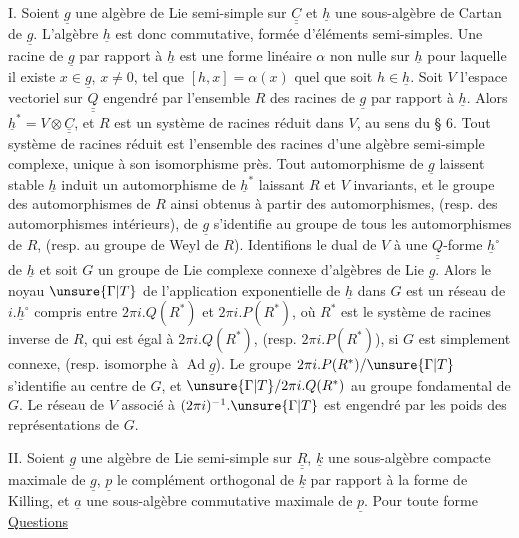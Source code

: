 I. Soient $\underline{g}$ une algèbre de Lie semi-simple sur $\underline{\underline{C}}$ et $\underline{h}$ une sous-algèbre de
Cartan de $\underline{g}$. L'algèbre $\underline{h}$ est donc commutative, formée d'éléments semi-simples.
Une racine de $\underline{g}$ par rapport à $\underline{h}$ est une forme linéaire $\alpha$ non nulle sur $\underline{h}$ pour
laquelle il existe $x\in\underline{g}$, $x\ne0$, tel que $[h,x]=\alpha(x)$ quel que soit $h\in\underline{h}$.
Soit $V$ l'espace vectoriel sur $\underline{\underline{Q}}$ engendré par l'ensemble $R$ des racines de $\underline{g}$ par
rapport à $\underline{h}$. Alors $\underline{h}^{*}=V\otimes\underline{\underline{C}}$, et $R$ est un système de racines réduit dans $V$,
au sens du § 6. Tout système de racines réduit est l'ensemble des racines d'une
algèbre semi-simple complexe, unique à son isomorphisme près. Tout automorphisme
de $\underline{g}$ laissent stable $\underline{h}$ induit un automorphisme de $\underline{h}^{*}$ laissant $R$ et $V$ invariants,
et le groupe des automorphismes de $R$ ainsi obtenus à partir des automorphismes,
(resp. des automorphismes intérieurs), de $\underline{g}$ s'identifie au groupe de tous les
automorphismes de $R$, (resp. au groupe de Weyl de $R$). Identifions le dual de $V$ à
une $\underline{\underline{Q}}$-forme $\underline{h}^{\circ}$ de $\underline{h}$ et soit $G$ un groupe de Lie complexe connexe d'algèbres de
Lie $\underline{g}$. Alors le noyau $\unsure{\Gamma|T}$ de l'application exponentielle de $\underline{h}$ dans $G$ est un réseau
de $i.\underline{h}^{\circ}$ compris entre $2\pi i.Q(R^{*})$ et $2\pi i.P(R^{*})$, où $R^{*}$ est le système de racines
inverse de $R$, qui est égal à $2\pi i.Q(R^{*})$, (resp. $2\pi i.P(R^{*})$), si $G$ est simplement
connexe, (resp. isomorphe à $\operatorname{Ad}\underline{g}$). Le groupe $2\pi i.P(R^{*})/\unsure{\Gamma|T}$ s'identifie au centre
de $G$, et $\unsure{\Gamma|T}/2\pi i.Q(R^{*})$ au groupe fondamental de $G$. Le réseau de $V$ associé à
$(2\pi i)^{-1}.\unsure{\Gamma|T}$ est engendré par les poids des représentations de $G$.

II. Soient $\underline{g}$ une algèbre de Lie semi-simple sur $\underline{\underline{R}}$, $\underline{k}$ une sous-algèbre compacte
maximale de $\underline{g}$, $\underline{p}$ le complément orthogonal de $\underline{k}$ par rapport à la forme de
Killing, et $\underline{a}$ une sous-algèbre commutative maximale de $\underline{p}$. Pour toute forme
\uline{Questions}

